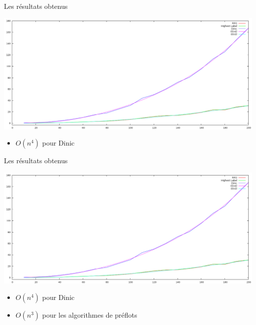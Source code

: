 \begin{frame}{Les résultats obtenus}
	\begin{minipage}[c]{0.50\linewidth}
		\includegraphics[scale=0.6]{img/resultat.png}
	\end{minipage}\hfill
	\begin{minipage}[c]{0.40\linewidth}
		\begin{itemize}
			\item $O(n^4)$ pour Dinic
			\end{itemize}
	\end{minipage}
\end{frame}

\begin{frame}{Les résultats obtenus}
	\begin{minipage}[c]{0.50\linewidth}
		\includegraphics[scale=0.6]{img/resultat.png}
	\end{minipage}\hfill
	\begin{minipage}[c]{0.40\linewidth}
		\begin{itemize}
			\item $O(n^4)$ pour Dinic
			\item $O(n^3)$ pour les algorithmes de préflots
		\end{itemize}
	\end{minipage}
\end{frame}

